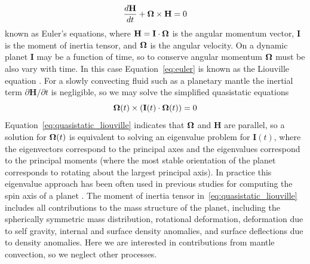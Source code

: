 \documentclass[extra,mreferee]{gji}
\begin{document}
\begin{equation}
\frac{d \mathbf{H}}{dt} + \mitbf{\Omega} \times \mathbf{H} = 0
\label{eq:euler}
\end{equation}
known as Euler's equations, where $\mathbf{H} = \mathbf{I} \cdot \mitbf{\Omega}$ is the angular momentum vector, $\mathbf{I}$ is the moment of inertia tensor, and $\mitbf{\Omega}$ is the angular velocity.
On a dynamic planet $\mathbf{I}$ may be a function of time, so to conserve angular momentum $\mitbf{\Omega}$ must be also vary with time.
In this case Equation~\eqref{eq:euler} is known as the Liouville equation \citep[e.g.][]{munk1960rotation}.
For a slowly convecting fluid such as a planetary mantle the inertial term $\partial \mathbf{H} / \partial t$ is negligible, so we may solve the simplified quasistatic equations
\begin{equation}
\mitbf{\Omega } (t)\times ( \mathbf{I}(t) \cdot \mitbf{\Omega }(t) ) = 0
\label{eq:quasistatic_liouville}
\end{equation}
Equation~\eqref{eq:quasistatic_liouville} indicates that $\mitbf{\Omega}$ and $\mathbf{H}$ are parallel, so a solution for $\mitbf{\Omega}(t)$ is equivalent to solving an eigenvalue problem for $\mathbf{I}(t)$, where the eigenvectors correspond to the principal axes and the eigenvalues correspond to the principal moments (where the most stable orientation of the planet corresponds to rotating about the largest principal axis).
In practice this eigenvalue approach has been often used in previous studies for computing the spin axis of a planet \citep[e.g.][]{steinberger1997changes, roberts2007cause}.
The moment of inertia tensor in~\eqref{eq:quasistatic_liouville} includes all contributions to the mass structure
of the planet, including the spherically symmetric mass distribution, rotational deformation, deformation due to self gravity, internal and surface density anomalies, and surface deflections due to density anomalies.
Here we are interested in contributions from mantle convection, so we neglect other processes.
\end{document}
